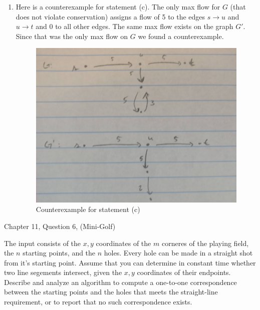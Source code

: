 \documentclass{article}
\begin{document}
\begin{enumerate}[label=(\alph*)]
    \item Here is a counterexample for statement (c).
    The only max flow for $G$ (that does not violate conservation) assigns a flow of 5 to the edges $s \to u$ and $u \to t$ and 0 to all other edges.
    The same max flow exists on the graph $G'$. Since that was the only max flow on $G$ we found a counterexample.
        \begin{figure}[h]
        \begin{center}
            \includegraphics[scale=0.1]{img/7-4-c}
            \caption{Counterexample for statement (c)}
            \label{fig:7-4-c}
        \end{center}
        \end{figure}
\end{enumerate}


\nextprob
{}

Chapter 11, Question 6, (Mini-Golf)

The input consists of the $x,y$ coordinates of the $m$ corneres of the playing field, the $n$ starting points, and the $n$ holes.
Every hole can be made in a straight shot from it's starting point.
Assume that you can determine in constant time whether two line segements intersect, given the $x,y$ coordinates of their endpoints.
Describe and analyze an algorithm to compute a one-to-one correspondence between the starting points and the holes that meets the straight-line requirement, or to report that no such correspondence exists.
\end{document}
